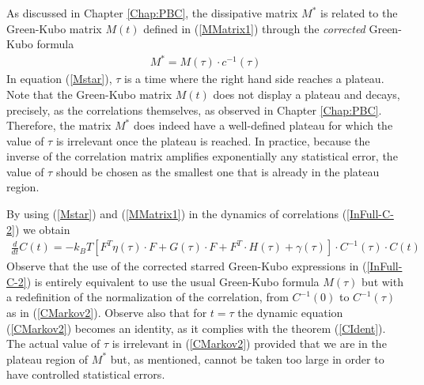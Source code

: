 \documentclass[b5paper,openright,10pt]{book}
\newcommand{\esc}{\!\cdot\!}
\begin{document}
As  discussed  in Chapter \ref{Chap:PBC},
the  dissipative matrix  $M^*$  is
related to  the Green-Kubo  matrix $M(t)$ defined  in (\ref{MMatrix1})
through the \textit{corrected} Green-Kubo formula
\begin{align}
  M^*=M(\tau)\esc c^{-1}(\tau)
\label{Mstar}
\end{align}
In  equation  (\ref{Mstar}),
$\tau$ is  a time where  the right hand  side reaches a  plateau. Note
that  the Green-Kubo  matrix $M(t)$  does  not display  a plateau  and
decays,  precisely, as  the  correlations themselves,  as observed  in
Chapter \ref{Chap:PBC}.  Therefore,  the  matrix  $M^*$  does  indeed  have  a
well-defined plateau for which the  value of $\tau$ is irrelevant once
the  plateau is  reached.  In  practice,  because the  inverse of  the
correlation matrix amplifies exponentially  any statistical error, the
value of $\tau$  should be chosen as the smallest  one that is already
in the plateau region.

By   using    (\ref{Mstar}) and (\ref{MMatrix1})   in   the   dynamics    of   correlations
(\ref{InFull-C-2}) we obtain
\begin{align}
\frac{d}{dt}C(t) =
-k_BT\left[{F}^T{\eta}(\tau)\esc{F}  +{G}(\tau)\esc F+F^T\esc{H}(\tau)+{\gamma}(\tau)\right]
\esc C^{-1}(\tau) \esc C(t)
\label{CMarkov2}
\end{align}
Observe that the  use of the corrected starred  Green-Kubo expressions in
(\ref{InFull-C-2}) is  entirely equivalent  to use the  usual Green-Kubo
formula $M(\tau)$ but with a redefinition of the normalization of the
correlation,    from    $C^{-1}(0)$    to   $C^{-1}(\tau)$    as    in
(\ref{CMarkov2}).   Observe  also  that  for  $t=\tau$  the  dynamic
equation (\ref{CMarkov2}) becomes an identity, as  it complies with  the theorem
(\ref{CIdent}).   The   actual  value  of  $\tau$   is  irrelevant  in
(\ref{CMarkov2}) provided that  we are in the plateau  region of $M^*$
but,  as  mentioned, cannot  be  taken  too  large  in order  to  have
controlled statistical errors.
\end{document}

